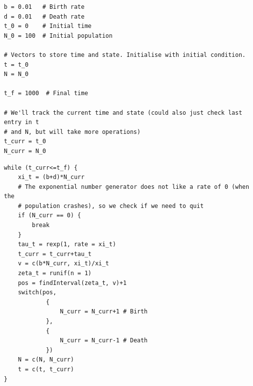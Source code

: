 \documentclass[aspectratio=169]{beamer}\usepackage[]{graphicx}\usepackage[]{xcolor}
\begin{document}
% 
% 
% 

\begin{frame}[fragile]
\begin{lstlisting}[language=Renhanced]
b = 0.01   # Birth rate
d = 0.01   # Death rate
t_0 = 0    # Initial time
N_0 = 100  # Initial population

# Vectors to store time and state. Initialise with initial condition.
t = t_0
N = N_0

t_f = 1000  # Final time

# We'll track the current time and state (could also just check last entry in t
# and N, but will take more operations)
t_curr = t_0
N_curr = N_0
\end{lstlisting}
\end{frame}

\begin{frame}[fragile]
\begin{lstlisting}[language=Renhanced]
while (t_curr<=t_f) {
    xi_t = (b+d)*N_curr
    # The exponential number generator does not like a rate of 0 (when the 
    # population crashes), so we check if we need to quit
    if (N_curr == 0) {
        break
    }
    tau_t = rexp(1, rate = xi_t)
    t_curr = t_curr+tau_t
    v = c(b*N_curr, xi_t)/xi_t
    zeta_t = runif(n = 1)
    pos = findInterval(zeta_t, v)+1
    switch(pos,
            { 
                N_curr = N_curr+1 # Birth
            },
            {
                N_curr = N_curr-1 # Death
            })
    N = c(N, N_curr)
    t = c(t, t_curr)
}
\end{lstlisting}
\end{frame}
\end{document}

